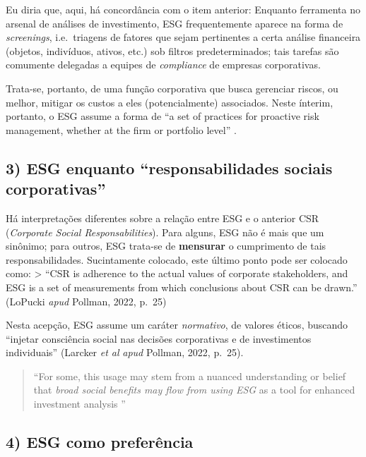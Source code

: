 \documentclass[12pt]{article}
\numberwithin{equation}{section}
\theoremstyle{plain}
\theoremstyle{definition}
\theoremstyle{remark}
\begin{document}
Eu diria que, aqui, há concordância com o item anterior: Enquanto ferramenta no arsenal de análises de investimento, ESG frequentemente aparece na forma de \textit{screenings}, i.e.~triagens de fatores que sejam pertinentes a certa análise financeira (objetos, indivíduos, ativos, etc.) sob filtros predeterminados; tais tarefas são comumente delegadas a equipes de \textit{compliance} de empresas corporativas.

Trata-se, portanto, de uma função corporativa que busca gerenciar riscos, ou melhor, mitigar os custos a eles (potencialmente) associados. Neste ínterim, portanto, o ESG assume a forma de ``a set of practices for proactive risk management, whether at the firm or portfolio level'' \parencite[, p. 24]{Pollman2022}.

\hypertarget{esg-enquanto-responsabilidades-sociais-corporativas}{%
\subsection{3) ESG enquanto ``responsabilidades sociais corporativas''}\label{esg-enquanto-responsabilidades-sociais-corporativas}}

Há interpretações diferentes sobre a relação entre ESG e o anterior CSR (\textit{Corporate Social Responsabilities}). Para alguns, ESG não é mais que um sinônimo; para outros, ESG trata-se de \textbf{mensurar} o cumprimento de tais responsabilidades. Sucintamente colocado, este último ponto pode ser colocado como: \textgreater{} ``CSR is adherence to the actual values of corporate stakeholders, and ESG is a set of measurements from which conclusions about CSR can be drawn.'' (LoPucki \textit{apud} Pollman, 2022, p.~25)

Nesta acepção, ESG assume um caráter \textit{normativo}, de valores éticos, buscando ``injetar consciência social nas decisões corporativas e de investimentos individuais'' (Larcker \textit{et al} \textit{apud} Pollman, 2022, p.~25).

\begin{quote}
``For some, this usage may stem from a nuanced understanding or belief that \textit{broad social benefits may flow from using ESG} as a tool for enhanced investment analysis \parencite[, p. 24, grifo meu]{Pollman2022}''
\end{quote}

\hypertarget{esg-como-preferuxeancia}{%
\subsection{4) ESG como preferência}\label{esg-como-preferuxeancia}}
\end{document}

